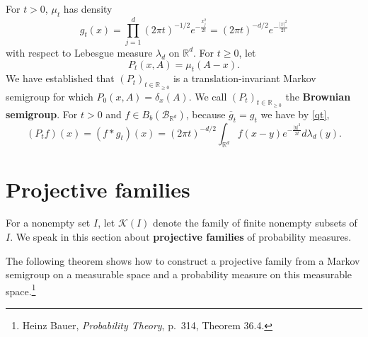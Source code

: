 \documentclass{article}
\theoremstyle{definition}
\begin{document}
For $t>0$, $\mu_t$ has density
\[
g_t(x) = \prod_{j=1}^d (2\pi t)^{-1/2} e^{-\frac{x_j^2}{2t}}
=(2\pi t)^{-d/2} e^{-\frac{|x|^2}{2t}}
\]
with respect to Lebesgue measure $\lambda_d$ on $\mathbb{R}^d$. 
For $t \geq 0$,
let
\[
P_t(x,A) = \mu_t(A-x).
\]
We have established that $(P_t)_{t \in \mathbb{R}_{\geq 0}}$ is a translation-invariant Markov semigroup
for which $P_0(x,A)=\delta_x(A)$. We call $(P_t)_{t \in \mathbb{R}_{\geq 0}}$ the \textbf{Brownian semigroup}.
For $t>0$ and $f \in B_b(\mathscr{B}_{\mathbb{R}^d})$,
because $\overline{g}_t=g_t$ we have by \eqref{qt},
\[
(P_t f)(x) = (f*g_t)(x) = 
(2\pi t)^{-d/2} \int_{\mathbb{R}^d} f(x-y) e^{-\frac{|y|^2}{2t}} d\lambda_d(y).
\]


\section{Projective families}
For a nonempty set $I$, let $\mathscr{K}(I)$ denote the family of finite nonempty subsets of $I$. 
We speak in this section about \textbf{projective families} of probability measures.


The following theorem shows how to construct a projective family from   a Markov semigroup on a measurable space and a probability measure
on this measurable space.\footnote{Heinz Bauer, {\em Probability Theory},
p.~314, Theorem 36.4.}
\end{document}
